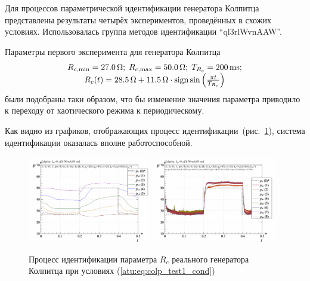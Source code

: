 Для процессов параметрической идентификации генератора Колпитца представлены результаты четырёх экспериментов,
проведённых в схожих условиях.
Использовалась группа методов идентификации ``ql3rlWvnAAW''.


Параметры первого эксперимента для генератора Колпитца
%
\begin{equation}
  \begin{array}{c}
    R_{c,\min} = \SI{27.0}{\ohm};
    \;
    R_{c,\max} = \SI{50.0}{\ohm};
    \;
    T_{R_c} = \SI{200}{\milli\second};
  \\
    R_c(t) = \SI{28.5}{\ohm} + \SI{11.5}{\ohm} \cdot \operatorname*{sign} \sin \left(  \frac{\pi t}{T_{R_c}}  \right)
  \end{array}
  \label{atu:eq:colp_test1_cond}
\end{equation}
%
были подобраны таки образом, что бы изменение значения параметра
приводило к переходу от хаотического режима к периодическому.

Как видно из графиков, отображающих процесс идентификации~(рис.~\ref{atu:f:colp_r_id_1}),
система идентификации оказалась вполне работоспособной.


\begin{figure}[htb!]
  \centerline{
    \includegraphics[width=0.48\textwidth]{p/r/colp_real_id-p_t_pi_ql3rlWvnAAW_real_d_0.png}
    \hfill
    \includegraphics[width=0.48\textwidth]{p/r/colp_real_id-p_t_p_ql3rlWvnAAW_real_d_0.png}
  }
  \caption{Процесс идентификации параметра $R_c$ реального генератора Колпитца при условиях (\ref{atu:eq:colp_test1_cond})}
  \label{atu:f:colp_r_id_1}
\end{figure}


